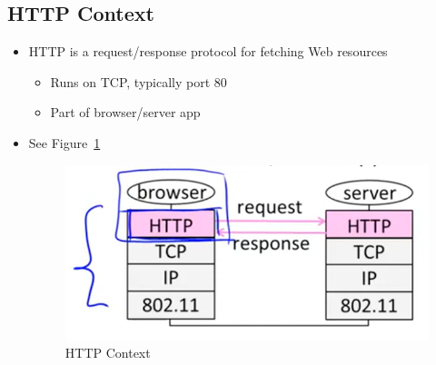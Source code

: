 \documentclass[12pt]{ctexart}   %
\begin{document}
	\subsection{HTTP Context}
	\begin{itemize}
		\item HTTP is a request/response protocol for fetching Web resources
		\begin{itemize}
			\item Runs on TCP, typically port 80
			\item Part of browser/server app
		\end{itemize}
		\item See Figure~\ref{fig:8-4-3}
		  
		 \begin{figure}[h!] %
		\centering
		 \includegraphics[scale=0.7]{images/8-4-3}
		\caption{ HTTP Context }
		 \label{fig:8-4-3}
		 \end{figure}
	\end{itemize}
	
\end{document}
